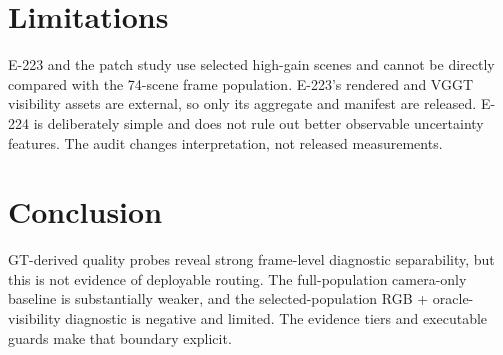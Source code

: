 \documentclass[10pt,twocolumn,letterpaper]{article}
\begin{document}
\section{Limitations}
E-223 and the patch study use selected high-gain scenes and cannot be directly
compared with the 74-scene frame population. E-223's rendered and VGGT visibility
assets are external, so only its aggregate and manifest are released. E-224 is
deliberately simple and does not rule out
better observable uncertainty features. The audit changes interpretation, not
released measurements.

\section{Conclusion}
GT-derived quality probes reveal strong frame-level diagnostic separability, but
this is not evidence of deployable routing. The full-population camera-only
baseline is substantially weaker, and the selected-population RGB + oracle-
visibility diagnostic is negative and limited. The evidence tiers and executable guards make that boundary
explicit.

{\small


}
\end{document}

